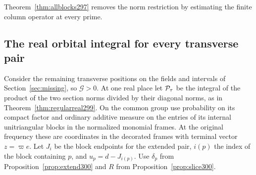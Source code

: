 \documentclass[a4paper,11pt]{article}
\theoremstyle{definition}
\theoremstyle{remark}
\numberwithin{equation}{section}
\begin{document}
Theorem~\ref{thm:allblocks297} removes the norm restriction by estimating the finite column operator at every prime.

\subsection{The real orbital integral for every transverse pair}\label{nav:I-72}
Consider the remaining transverse positions on the fields and
intervals of Section~\ref{sec:missing}, so \(\mathcal G>0\). At one real
place let \({\cal P}_\tau\) be the integral of the product
of the two section norms divided by their diagonal norms,
as in Theorem~\ref{thm:regularreal299}. On the common group
use probability on its compact factor and ordinary additive
measure on the entries of its internal unitriangular blocks
in the normalized monomial frames. At the original frequency
these are coordinates in the decorated frames with terminal
vector \(z=\varpi e\). Let \(J_i\) be the block endpoints for
the extended pair, \(i(p)\) the index of the block containing
\(p\), and \(u_p=d-J_{i(p)}\). Use \(\delta_p\) from
Proposition~\ref{prop:extend300} and \(R\) from
Proposition~\ref{prop:slice300}.
\end{document}
